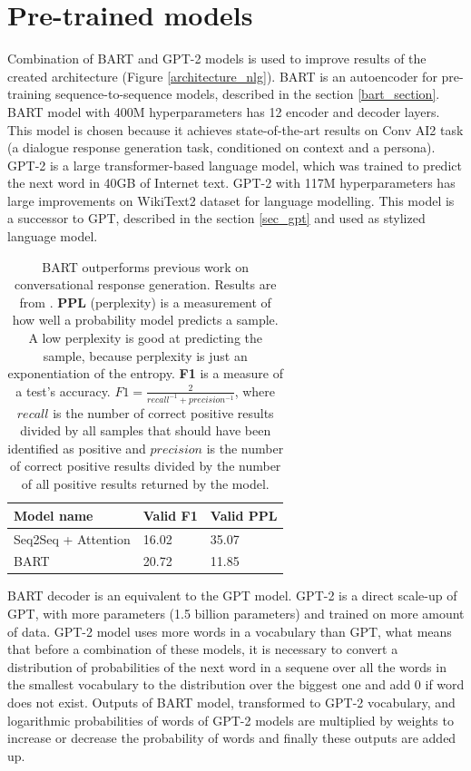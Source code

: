 \section{Pre-trained models}
Combination of BART and GPT-2 models is used to improve results of the created architecture (Figure \ref{architecture_nlg}). BART is an autoencoder for pre-training sequence-to-sequence models, described in the section \ref{bart_section}. BART model with 400M hyperparameters has 12 encoder and decoder layers. This model is chosen because it achieves state-of-the-art results on Conv AI2 task (a dialogue response generation task, conditioned on context and a persona). GPT-2 is a large transformer-based language model, which was trained to predict the next word in 40GB of Internet text. GPT-2 with 117M hyperparameters has large improvements on WikiText2 dataset for language modelling. This model is a successor to GPT, described in the section \ref{sec_gpt} and used as stylized language model. 

\begin{table}[ht]
\centering
 \begin{tabular}{|p{5cm}|p{3cm}|p{3cm}|} 
 \hline
 \textbf{Model name} & \textbf{Valid F1} & \textbf{Valid PPL} \\
 \hline
 Seq2Seq + Attention & 16.02 & 35.07 \\
 \hline
 BART & 20.72 & 11.85 \\
 \hline
 \end{tabular}
 \caption{BART outperforms previous work on conversational response generation. Results are from \cite{lewis2019bart}. \textbf{PPL} (perplexity) is a measurement of how well a probability model predicts a sample. A low perplexity is good at predicting the sample, because perplexity is just an exponentiation of the entropy. \textbf{F1} is a measure of a test's accuracy. $F1 = \frac{2}{recall^{-1} + precision^{-1}}$, where $recall$ is the number of correct positive results divided by all samples that should have been identified as positive and $precision$ is the number of correct positive results divided by the number of all positive results returned by the model.}
\label{tab:bart_statistic}
\end{table}

BART decoder is an equivalent to the GPT model. GPT-2 is a direct scale-up of GPT, with more parameters (1.5 billion parameters) and trained on more amount of data. GPT-2 model uses more words in a vocabulary than GPT, what means that before a combination of these models, it is necessary to convert a distribution of probabilities of the next word in a sequene over all the words in the smallest vocabulary to the distribution over the biggest one and add 0 if word does not exist. Outputs of BART model, transformed to GPT-2 vocabulary, and logarithmic probabilities of words of GPT-2 models are multiplied by weights to increase or decrease the probability of words and finally these outputs are added up.

